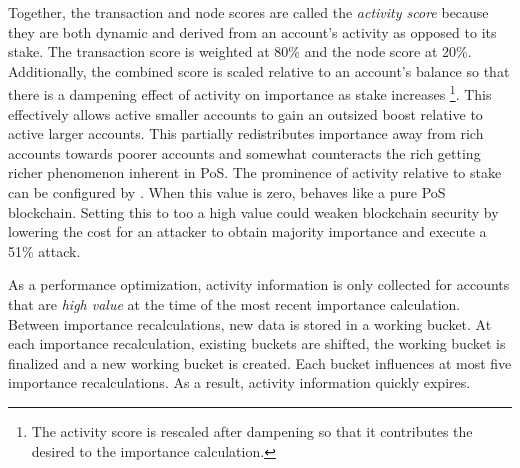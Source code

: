 Together, the transaction and node scores are called the \emph{activity score} because they are both dynamic and derived from an account's activity as opposed to its stake.
The transaction score is weighted at 80\% and the node score at 20\%.
Additionally, the combined score is scaled relative to an account's balance so that there is a dampening effect of activity on importance as stake increases
\footnote{The activity score is rescaled after dampening so that it contributes the desired  to the importance calculation.}.
This effectively allows active smaller accounts to gain an outsized boost relative to active larger accounts.
This partially redistributes importance away from rich accounts towards poorer accounts and somewhat counteracts the rich getting richer phenomenon inherent in PoS.
The prominence of activity relative to stake can be configured by .
When this value is zero, \codenamespace behaves like a pure PoS blockchain.
Setting this to too a high value could weaken blockchain security by lowering the cost for an attacker to obtain majority importance and execute a 51\% attack.

As a performance optimization, activity information is only collected for accounts that are \emph{high value} at the time of the most recent importance calculation.
Between importance recalculations, new data is stored in a working bucket.
At each importance recalculation, existing buckets are shifted, the working bucket is finalized and a new working bucket is created.
Each bucket influences at most five importance recalculations.
As a result, activity information quickly expires.

